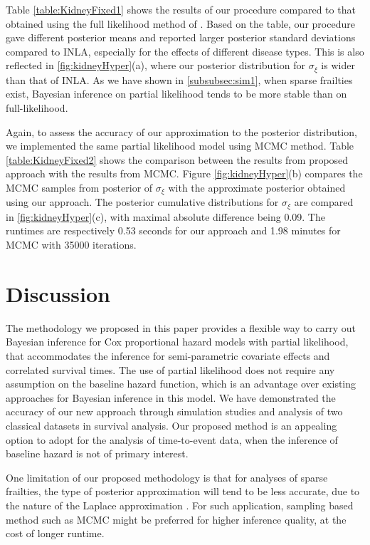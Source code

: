 \documentclass[ba]{imsart}
\begin{document}
Table \ref{table:KidneyFixed1} shows the results of our procedure compared to that obtained using the full likelihood method of \cite{inlacoxph}. Based on the table, our procedure gave different posterior means and reported larger posterior standard deviations compared to INLA, especially for the effects of different disease types. This is also reflected in \ref{fig:kidneyHyper}(a), where our posterior distribution for $\sigma_{\xi}$ is wider than that of INLA. As we have shown in \ref{subsubsec:sim1}, when sparse frailties exist, Bayesian inference on partial likelihood tends to be more stable than on full-likelihood.

Again, to assess the accuracy of our approximation to the posterior distribution, we implemented the same partial likelihood model using MCMC method. Table \ref{table:KidneyFixed2} shows the comparison between the results from proposed approach with the results from MCMC. Figure \ref{fig:kidneyHyper}(b) compares the MCMC samples from posterior of $\sigma_{\xi}$ with the approximate posterior obtained using our approach. The posterior cumulative distributions for $\sigma_{\xi}$ are compared in \ref{fig:kidneyHyper}(c), with maximal absolute difference being 0.09. The runtimes are respectively 0.53 seconds for our approach and 1.98 minutes for MCMC with 35000 iterations.

\section{Discussion}\label{sec:discussion}

The methodology we proposed in this paper provides a flexible way to carry out Bayesian inference for Cox proportional hazard models with partial likelihood, that accommodates the inference for semi-parametric covariate effects and correlated survival times. The use of partial likelihood does not require any assumption on the baseline hazard function, which is an advantage over existing approaches for Bayesian inference in this model. We have demonstrated the accuracy of our new approach through simulation studies and analysis of two classical datasets in survival analysis. Our proposed method is an appealing option to adopt for the analysis of time-to-event data, when the inference of baseline hazard is not of primary interest.

One limitation of our proposed methodology is that for analyses of sparse frailties, the type of posterior approximation will tend to be less accurate, due to the nature of the Laplace approximation \citep{Ogden2013ASR}. For such application, sampling based method such as MCMC might be preferred for higher inference quality, at the cost of longer runtime. 
\end{document}
